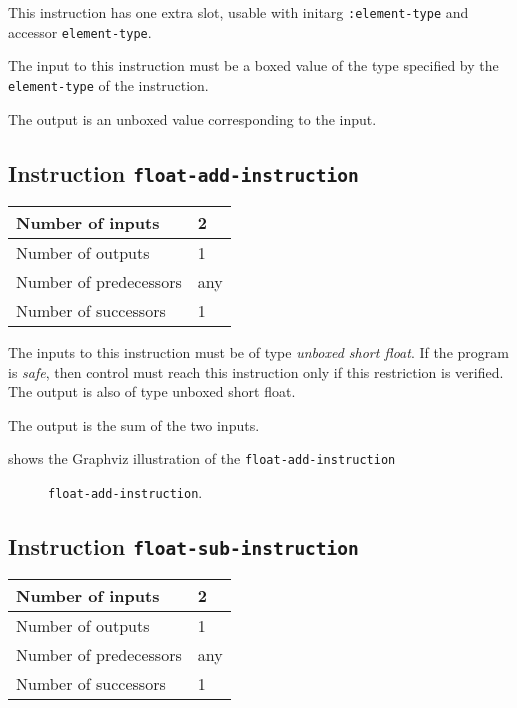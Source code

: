 This instruction has one extra slot, usable with initarg
\texttt{:element-type} and accessor \texttt{element-type}.

The input to this instruction must be a boxed value of the type
specified by the \texttt{element-type} of the instruction.

The output is an unboxed value corresponding to the input.

\subsection{Instruction \texttt{float-add-instruction}}
\label{mir-instruction-float-add}

\begin{tabular}{|l|l|}
\hline
Number of inputs & 2\\
\hline
Number of outputs & 1\\
\hline
Number of predecessors & any\\
\hline
Number of successors & 1\\
\hline
\end{tabular}

The inputs to this instruction must be of type \emph{unboxed short
  float}.  If the program is \emph{safe}, then control must reach this
instruction only if this restriction is verified.  The output is also
of type unboxed short float.

The output is the sum of the two inputs.

 shows the Graphviz illustration of the
\texttt{float-add-instruction}

\begin{figure}
\begin{center}
\end{center}
\caption{\label{fig-float-add-instruction}
\texttt{float-add-instruction}.}
\end{figure}

\subsection{Instruction \texttt{float-sub-instruction}}
\label{mir-instruction-float-sub}

\begin{tabular}{|l|l|}
\hline
Number of inputs & 2\\
\hline
Number of outputs & 1\\
\hline
Number of predecessors & any\\
\hline
Number of successors & 1\\
\hline
\end{tabular}

